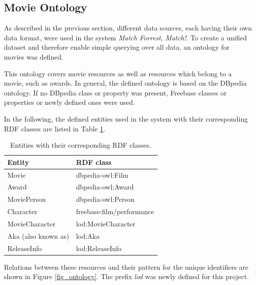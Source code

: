 \subsection{Movie Ontology}
\label{subsec_method_ontology}

As described in the previous section, different data sources, each having their own data format, were used in the system \emph{Match Forrest, Match!}.
To create a unified dataset and therefore enable simple querying over all data, an ontology for movies was defined.

This ontology covers movie resources as well as resources which belong to a movie, such as awards.
In general, the defined ontology is based on the DBpedia ontology.
If no DBpedia class or property was present, Freebase classes or properties or newly defined ones were used.

In the following, the defined entities used in the system with their corresponding RDF classes are listed in Table \ref{tab_entities}.

\begin{table}[ht]
	\begin{center}
	\begin{tabular}{ll}
		\textbf{Entity} & \textbf{RDF class} \\ \hline
		Movie & dbpedia-owl:Film \\
		Award & dbpedia-owl:Award \\
		MoviePerson & dbpedia-owl:Person \\
		Character & freebase:film/performance \\
		MovieCharacter & lod:MovieCharacter \\
		Aka (also known as) & lod:Aka \\
		ReleaseInfo & lod:ReleaseInfo \\
	\end{tabular}
	\end{center}
	\caption{Entities with their corresponding RDF classes.}
	\label{tab_entities}
\end{table}

Relations between these resources and their pattern for the unique identifiers are shown in Figure \ref{fig_ontology}.
The prefix \textit{lod} was newly defined for this project.

